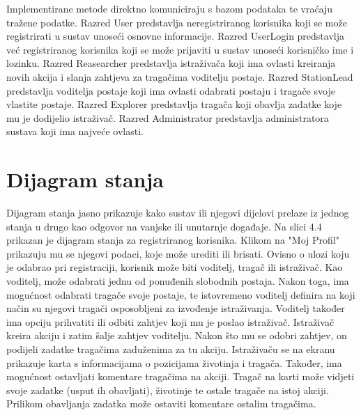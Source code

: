 			\vspace{36pt}
			
			Implementirane metode direktno komuniciraju s bazom podataka te vraćaju tražene podatke. Razred User predstavlja neregistriranog korisnika koji se može registrirati u sustav unoseći osnovne informacije. Razred UserLogin predstavlja već registriranog korisnika koji se može prijaviti u sustav unoseći korisničko ime i lozinku. Razred Reasearcher predstavlja istraživača koji ima ovlasti kreiranja novih akcija i slanja zahtjeva za tragačima voditelju postaje. Razred StationLead predstavlja voditelja postaje koji ima ovlasti odabrati postaju i tragače svoje vlastite postaje. Razred Explorer predstavlja tragača koji obavlja zadatke koje mu je dodijelio istraživač. Razred Administrator predstavlja administratora sustava koji ima najveće ovlasti.
			
			\vspace{36pt}
		
		\section{Dijagram stanja}
			
			Dijagram stanja jasno prikazuje kako sustav ili njegovi dijelovi prelaze iz jednog stanja u drugo kao odgovor na vanjske ili unutarnje događaje. Na slici 4.4 prikazan je dijagram stanja za registriranog korisnika. Klikom na "Moj Profil" prikazuju mu se njegovi podaci, koje može urediti ili brisati. Ovisno o ulozi koju je odabrao pri registraciji, korisnik može biti voditelj, tragač ili istraživač. Kao voditelj, može odabrati jednu od ponuđenih slobodnih postaja. Nakon toga, ima mogućnost odabrati tragače svoje postaje, te istovremeno voditelj definira na koji način su njegovi tragači osposobljeni za izvođenje istraživanja. Voditelj također ima opciju prihvatiti ili odbiti zahtjev koji mu je poslao istraživač. Istraživač kreira akciju i zatim šalje zahtjev voditelju. Nakon što mu se odobri zahtjev, on podijeli zadatke tragačima zaduženima za tu akciju. Istraživaču se na ekranu prikazuje karta s informacijama o pozicijama životinja i tragača. Također, ima mogućnost ostavljati komentare tragačima na akciji. Tragač na karti može vidjeti svoje zadatke (usput ih obavljati), životinje te ostale tragače na istoj akciji. Prilikom obavljanja zadatka može ostaviti komentare ostalim tragačima.
			
